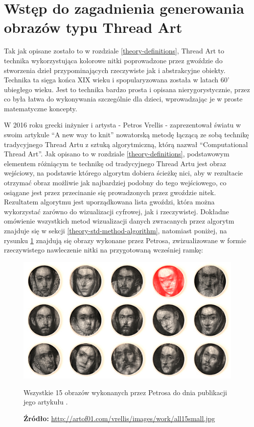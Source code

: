 \documentclass[a4paper, 12pt, polish, twoside]{extreport}
\begin{document}
    \section{Wstęp do zagadnienia generowania obrazów typu Thread Art} \label{theory-intro}
    Tak jak opisane zostało to w rozdziale \ref{theory-definitions}, Thread Art to technika wykorzystująca kolorowe nitki poprowadzone przez gwoździe do stworzenia dzieł przypominających rzeczywiste jak i abstrakcyjne obiekty. Technika ta sięga końca XIX wieku i spopularyzowana została w latach 60' ubiegłego wieku. Jest to technika bardzo prosta i opisana nierygorystycznie, przez co była łatwa do wykonywania szczególnie dla dzieci, wprowadzając je w proste matematyczne koncepty. 
    
    W 2016 roku grecki inżynier i artysta - Petros Vrellis - zaprezentował światu w swoim artykule ``A new way to knit'' \cite{new-way-to-knit} nowatorską metodę łączącą ze sobą technikę tradycyjnego Thread Artu z sztuką algorytmiczną, którą nazwał ``Computational Thread Art''. Jak opisano to w rozdziale \ref{theory-definitions}, podstawowym elementem różniącym te technikę od tradycyjnego Thread Artu jest obraz wejściowy, na podstawie którego algorytm dobiera ścieżkę nici, aby w rezultacie otrzymać obraz możliwie jak najbardziej podobny do tego wejściowego, co osiągane jest przez przecinanie się prowadzonych przez gwoździe nitek. Rezultatem algorytmu jest uporządkowana lista gwoździ, która można wykorzystać zarówno do wizualizacji cyfrowej, jak i rzeczywistej. Dokładne omówienie wszystkich metod wizualizacji danych zwracanych przez algorytm znajduje się w sekcji \ref{theory-std-method-algorithm}, natomiast poniżej, na rysunku \ref{theory-all-petros-art} znajdują się obrazy wykonane przez Petrosa, zwizualizowane w formie rzeczywistego nawleczenie nitki na przygotowaną wcześniej ramkę:
    
    \begin{figure}[H]
        \centering
        \includegraphics[width=\textwidth,keepaspectratio]{img/2-theory/petros-art.jpg}
        \caption[Obrazy Petrosa]{Wszystkie 15 obrazów wykonanych przez Petrosa do dnia publikacji jego artykułu \cite{new-way-to-knit}.}
        \caption*{\footnotesize{\textbf{Źródło:} {\url{http://artof01.com/vrellis/images/work/all15small.jpg}}}}
        \label{theory-all-petros-art}
    \end{figure}
    
\end{document}
